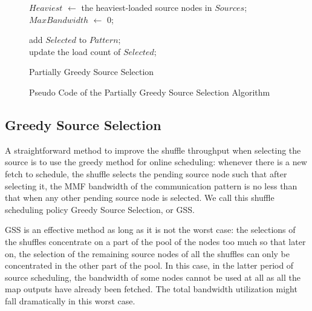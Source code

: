 \documentclass[10pt,journal,compsoc]{IEEEtran}
\makeatletter
\newcommand{\removelatexerror}{\let\@latex@error\@gobble}
\makeatother
\begin{document}
\begin{figure}[!t]
\removelatexerror
\begin{algorithm}[H]


 $Heaviest$ $\gets$ the heaviest-loaded source nodes in $Sources$;\\
 $MaxBandwidth$ $\gets$ 0;
 
add $Selected$ to $Pattern$;\\
update the load count of $Selected$;
\caption{Partially Greedy Source Selection}
\label{algo:PGSS}
\end{algorithm}
\caption{Pseudo Code of the Partially Greedy Source Selection Algorithm}
\label{fig:PGSS}
\end{figure}



\subsection{Greedy Source Selection}
A straightforward method to improve the shuffle throughput when
selecting the source is
to use the greedy method for online scheduling: 
whenever there is a new fetch to schedule, the shuffle selects the
pending source node such that after selecting it,
the MMF bandwidth of the communication pattern is no less
than that
when any other pending source node is selected. We call this shuffle
scheduling policy Greedy Source Selection, or GSS.


GSS is an effective method as long as it is not the
worst case:
the selections of the shuffles concentrate on a part of the pool of the
nodes too much
so that later on, the selection of the remaining source nodes of all
the shuffles can only be concentrated in the other part of the pool.
In this case, in the latter period of source scheduling,
the bandwidth of some nodes cannot be used at all as all the map
outputs have already been fetched.
The total bandwidth utilization might fall dramatically in this worst case. 
\end{document}
